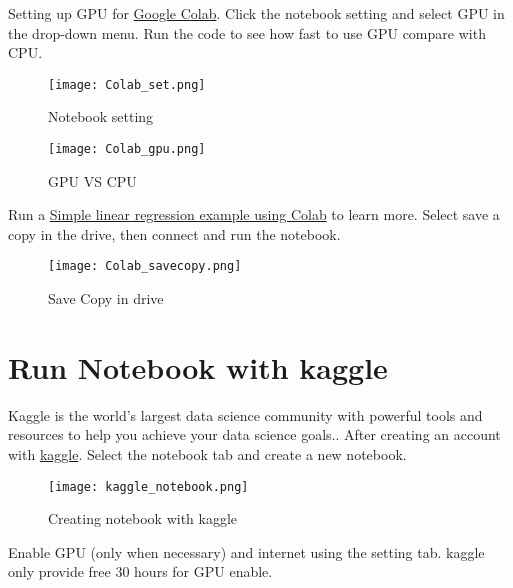 \documentclass[a4paper,10pt]{article}
\begin{document}
Setting up GPU for \href{https://colab.research.google.com/notebooks/gpu.ipynb#scrollTo=bwdaz5SIOGe9}{Google Colab}. Click the notebook setting and select GPU in the drop-down menu. Run the code to see how fast to use GPU compare with CPU. 

\begin{figure}[H]
\centering
\texttt{[image: Colab\_set.png]}
\caption[Short title]{Notebook setting}
\label{fig:ff1}\end{figure}

\begin{figure}[H]
\centering
\texttt{[image: Colab\_gpu.png]}
\caption[Short title]{GPU VS CPU}
\label{fig:ff1}\end{figure}

Run a \href{https://colab.research.google.com/drive/1cTsVAAm4pZqNgPq1A17d1pCWe1i4iIWD?usp=sharing}{Simple linear regression example using Colab} to learn more. Select save a copy in the drive, then connect and run the notebook.

\begin{figure}[H]
\centering
\texttt{[image: Colab\_savecopy.png]}
\caption[Short title]{Save Copy in drive}
\label{fig:ff1}\end{figure}

\medskip

\newpage

\section{Run Notebook with kaggle}
Kaggle is the world's largest data science community with powerful tools and resources to help you achieve your data science goals.\cite{Kaggle}.
After creating an account with \href{https://www.kaggle.com/}{kaggle}. Select the notebook tab and create a new notebook.
\vspace{5mm}

\begin{figure}[H]
\centering
\texttt{[image: kaggle\_notebook.png]}
\caption[Short title]{Creating notebook with kaggle}
\label{fig:ff1}\end{figure}
\vspace{5mm}

Enable GPU (only when necessary) and internet using the setting tab. kaggle only provide free 30 hours for GPU enable.  
\vspace{5mm}
\end{document}
